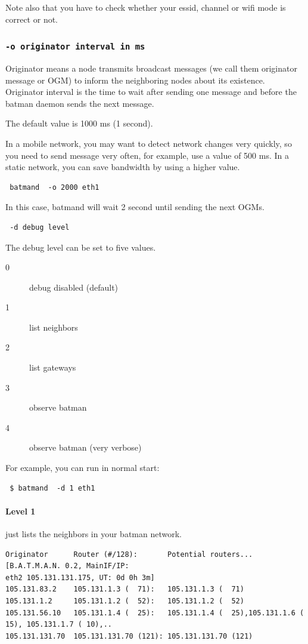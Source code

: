 \documentclass[
	12pt,
	a4paper,
	twoside,
	english,
	headsepline,
	footnosepline,
	automark,
	normalheadings,
	openany,
	cleardoubleplain,
	abstracton,
	idxtotoc,
	liststotoc,
	bibtotoc,
 	BCOR8mm,
]{scrartcl}
\newcommand{\subsubsectionttt}[1]{\subsubsection{\texttt{#1}}}
\begin{document}
Note also that you have to check whether your essid, channel or wifi mode is correct or not.

\subsubsectionttt{-o originator interval in ms}
 Originator means a node transmits broadcast messages (we call them originator message or  OGM) to inform the neighboring nodes about its existence. Originator interval is the time to wait after sending one message and before the batman  daemon sends the next message.

The default value is 1000 ms (1 second).

In a mobile network, you may want to detect network changes very quickly, so you need to  send message very often, for example, use a value of 500 ms. In a static network, you can save bandwidth by using a higher value.
\begin{verbatim} batmand  -o 2000 eth1\end{verbatim}
In this case, batmand will wait 2 second until sending the next OGMs.

\begin{verbatim} -d debug level\end{verbatim}
The debug level can be set to five values.

\begin{description}
 \item[0] debug disabled (default)
 \item[1] list neighbors
 \item[2] list gateways
 \item[3] observe batman
 \item[4] observe batman (very verbose)
\end{description}

For example, you can run in normal start:
\begin{verbatim}
 $ batmand  -d 1 eth1
\end{verbatim}

\paragraph*{Level 1}
just lists the neighbors in your batman network.

\begin{lstlisting}[basicstyle=\footnotesize,	frame=single, columns= flexible]
Originator      Router (#/128):       Potential routers... [B.A.T.M.A.N. 0.2, MainIF/IP:
eth2 105.131.131.175, UT: 0d 0h 3m]
105.131.83.2    105.131.1.3 (  71):   105.131.1.3 (  71)
105.131.1.2     105.131.1.2 (  52):   105.131.1.2 (  52)
105.131.56.10   105.131.1.4 (  25):   105.131.1.4 (  25),105.131.1.6 ( 15), 105.131.1.7 ( 10),..
105.131.131.70  105.131.131.70 (121): 105.131.131.70 (121)
\end{lstlisting}
\end{document}
